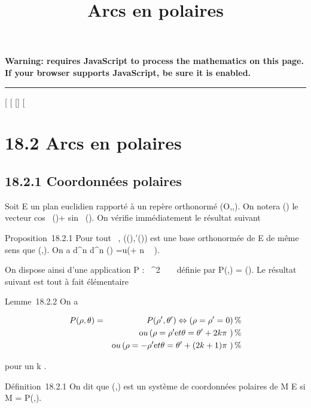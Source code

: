 \documentclass[]{article}
\title{Arcs en polaires}
\author{}
\date{}
\begin{document}
\maketitle

\textbf{Warning: 
requires JavaScript to process the mathematics on this page.\\ If your
browser supports JavaScript, be sure it is enabled.}

\begin{center}\rule{3in}{0.4pt}\end{center}

[
[
[]
[

\section{18.2 Arcs en polaires}

\subsection{18.2.1 Coordonnées polaires}

Soit E un plan euclidien rapporté à un repère orthonormé
(O,\vec\imath,). On notera
\vecu(\theta) le vecteur cos~
(\theta)\vec\imath + sin~
(\theta). On vérifie immédiatement le résultat
suivant

Proposition~18.2.1 Pour tout \theta \in {}~,
(\vecu(\theta),\vecu'(\theta)) est une base
orthonormée de E de même sens que
(\vec\imath,). On a 
d^n \over d\theta^n
\vecu(\theta) =\vec u(\theta + n \pi~
 ).

On dispose ainsi d'une application P : ~^2 \rightarrow~ ~ définie par
P(\rho,\theta) = \rho\vecu(\theta). Le résultat suivant est tout à
fait élémentaire

Lemme~18.2.2 On a

\begin{align*} P(\rho,\theta)& =& P(\rho',\theta')
\Leftrightarrow \left (\rho = \rho' =
0\right ) \%& \\ & &
\text ou \left (\rho =
\rho'\text et \theta = \theta' + 2k\pi~\right ) \%&
\\ & & \text ou
\left (\rho = -\rho'\text et \theta = \theta' + (2k
+ 1)\pi~\right )\%& \\
\end{align*}

pour un k \in {}.

Définition~18.2.1 On dit que (\rho,\theta) est un système de coordonnées
polaires de M \in E si M = P(\rho,\theta).
\end{document}
